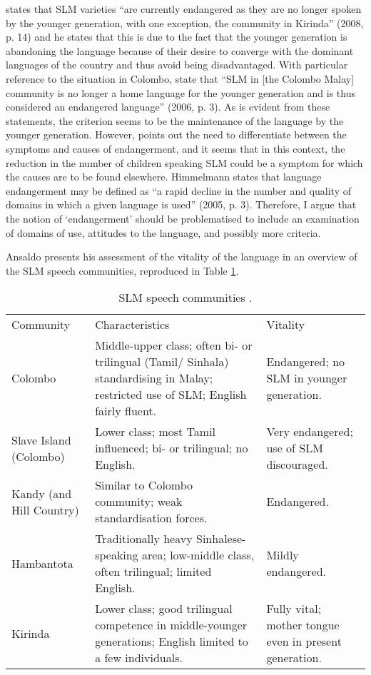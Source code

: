 \citet{Ansaldo2008genesis} states that SLM varieties ``are currently endangered as they are no longer spoken by the younger generation, with one exception, the community in Kirinda'' (2008, p. 14) and he states that this is due to the fact that the younger generation is abandoning the language because of their desire to converge with the dominant languages of the country and thus avoid being disadvantaged.  With particular reference to the situation in Colombo, \citet{LimEtAl2006} state that ``SLM in [the Colombo Malay] community is no longer a home language for the younger generation and is thus considered an endangered language'' (2006, p. 3). As is evident from these statements, the criterion seems to be the maintenance of the language by the younger generation. However, \citet{Himmelmann2005endangered} points out the need to differentiate between the symptoms and causes of endangerment, and it seems that in this context, the reduction in the number of children speaking SLM could be a symptom for which the causes are to be found elsewhere. Himmelmann states that language endangerment may be defined as ``a rapid decline in the number and quality of domains in which a given language is used'' (2005, p. 3). Therefore, I argue that the notion of `endangerment' should be problematised to include an examination of domains of use, attitudes to the language, and possibly more criteria.  

Ansaldo presents his assessment of the vitality of the language in an overview of the SLM speech communities, reproduced in Table \ref{rassool:tab:1}. 

\begin{table}
\begin{tabular}{p{2cm}p{4cm}p{4cm}}
Community &Characteristics &Vitality\\
Colombo &
Middle-upper class; often bi- or trilingual (Tamil/ Sinhala) standardising in Malay; restricted use of SLM; English fairly fluent. &
Endangered; no SLM in younger generation.\\
Slave Island (Colombo) &
Lower class; most Tamil influenced; bi- or trilingual; no English. &
Very endangered; use of SLM discouraged.\\
Kandy (and Hill Country)  &
Similar to Colombo community; weak standardisation forces. &
Endangered.\\
Hambantota &
Traditionally heavy Sinhalese-speaking area; low-middle class, often trilingual; limited English. &
Mildly endangered.\\
Kirinda &
Lower class; good trilingual competence in middle-younger generations; English limited to a few individuals. &
Fully vital; mother tongue even in present generation.\\
\end{tabular}
\caption{SLM speech communities \citep[from][]{Ansaldo2008genesis}.}%
\label{rassool:tab:1}
\end{table}

